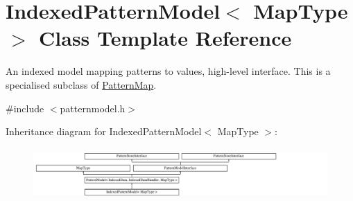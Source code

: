 \hypertarget{classIndexedPatternModel}{}\section{Indexed\+Pattern\+Model$<$ Map\+Type $>$ Class Template Reference}
\label{classIndexedPatternModel}


An indexed model mapping patterns to values, high-\/level interface. This is a specialised subclass of \hyperlink{classPatternMap}{Pattern\+Map}.  




{\ttfamily \#include $<$patternmodel.\+h$>$}

Inheritance diagram for Indexed\+Pattern\+Model$<$ Map\+Type $>$\+:\begin{figure}[H]
\begin{center}
\leavevmode
\includegraphics[height=1.991111cm]{classIndexedPatternModel}
\end{center}
\end{figure}
